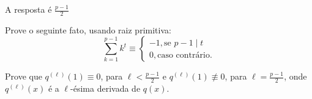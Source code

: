 \documentclass[10pt,a4paper]{article}
\begin{document}
	\newpage
	\begin{sk} A resposta é $\frac{p-1}{2}$

		Prove o seguinte fato, usando raiz primitiva: \[
			\sum_{k=1}^{p-1} k^t \equiv
			\begin{cases}
				-1, \text{se }p-1 \mid t\\
				0, \text{caso contrário.}
			\end{cases}
		\]

		Prove que $q^{(\ell)}(1) \equiv 0$, para $\ell < \frac{p-1}{2}$ e 
		$q^{(\ell)}(1) \not\equiv 0$, para $\ell = \frac{p-1}{2}$, onde $q^{(\ell)}(x)$ é a $\ell$-ésima derivada de $q(x)$.
	\end{sk}
\end{document}
